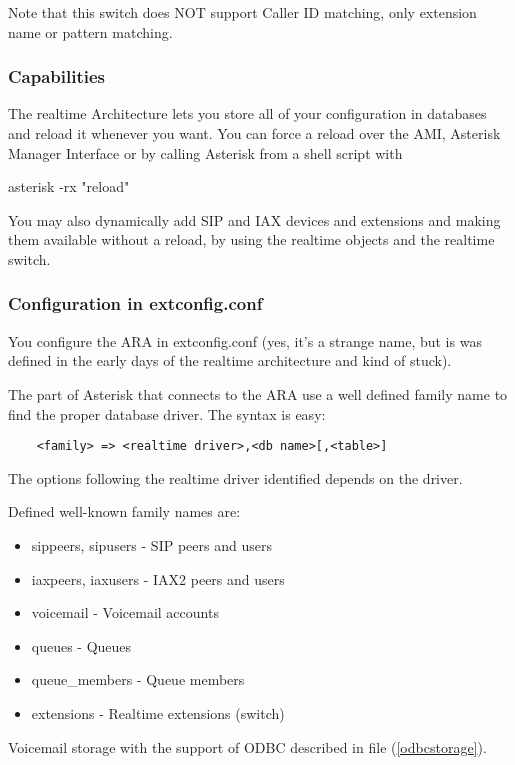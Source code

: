 Note that this switch does NOT support Caller ID matching, only
extension name or pattern matching.

\subsubsection{Capabilities}

The realtime Architecture lets you store all of your configuration in
databases and reload it whenever you want. You can force a reload over
the AMI, Asterisk Manager Interface or by calling Asterisk from a
shell script with

  asterisk -rx "reload"

You may also dynamically add SIP and IAX devices and extensions
and making them available without a reload, by using the realtime
objects and the realtime switch.

\subsubsection{Configuration in extconfig.conf}

You configure the ARA in extconfig.conf (yes, it's a strange name, but
is was defined in the early days of the realtime architecture and kind
of stuck).

The part of Asterisk that connects to the ARA use a well defined family
name to find the proper database driver. The syntax is easy:

\begin{verbatim}
    <family> => <realtime driver>,<db name>[,<table>]
\end{verbatim}

The options following the realtime driver identified depends on the
driver.

Defined well-known family names are:

\begin{itemize}
  \item sippeers, sipusers - SIP peers and users
  \item iaxpeers, iaxusers - IAX2 peers and users
  \item voicemail - Voicemail accounts
  \item queues - Queues
  \item queue\_members - Queue members
  \item extensions - Realtime extensions (switch)
\end{itemize}

Voicemail storage with the support of ODBC described in file
 (\ref{odbcstorage}).

